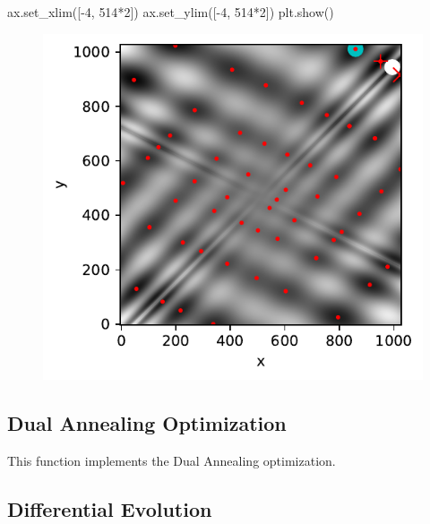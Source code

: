 \documentclass[
  letterpaper,
  DIV=11,
  numbers=noendperiod]{scrreprt}
\newenvironment{Shaded}{\begin{snugshade}}{\end{snugshade}}
\newcommand{\DecValTok}[1]{\textcolor[rgb]{0.68,0.00,0.00}{#1}}
\newcommand{\NormalTok}[1]{\textcolor[rgb]{0.00,0.23,0.31}{#1}}
\newcommand{\OperatorTok}[1]{\textcolor[rgb]{0.37,0.37,0.37}{#1}}
\begin{document}
\begin{Shaded}
\begin{Highlighting}[]
\NormalTok{ax.set\_xlim([}\OperatorTok{{-}}\DecValTok{4}\NormalTok{, }\DecValTok{514}\OperatorTok{*}\DecValTok{2}\NormalTok{])}
\NormalTok{ax.set\_ylim([}\OperatorTok{{-}}\DecValTok{4}\NormalTok{, }\DecValTok{514}\OperatorTok{*}\DecValTok{2}\NormalTok{])}
\NormalTok{plt.show()}
\end{Highlighting}
\end{Shaded}

\begin{figure}[H]

{\centering \includegraphics{003_scipy_optimize_intro_files/figure-pdf/cell-14-output-1.pdf}

}

\end{figure}

\hypertarget{dual-annealing-optimization}{%
\subsection{Dual Annealing
Optimization}\label{dual-annealing-optimization}}

This function implements the Dual Annealing optimization.

\hypertarget{differential-evolution}{%
\subsection{Differential Evolution}\label{differential-evolution}}
\end{document}
